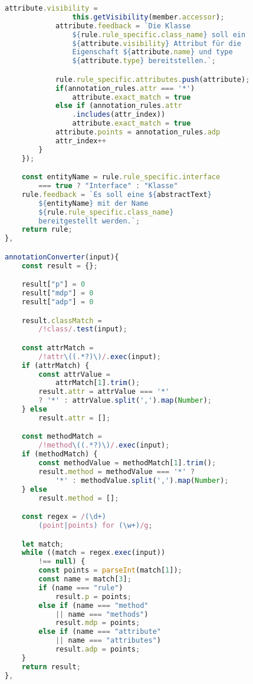 \begin{lstlisting}[caption={Class Definition Rule}, label={lst:rule_object_gen}, language=javascript]
            attribute.visibility =
                this.getVisibility(member.accessor);
            attribute.feedback = `Die Klasse
                ${rule.rule_specific.class_name} soll ein
                ${attribute.visibility} Attribut für die
                Eigenschaft ${attribute.name} und type
                ${attribute.type} bereitstellen.`;

            rule.rule_specific.attributes.push(attribute);
            if(annotation_rules.attr === '*')
                attribute.exact_match = true
            else if (annotation_rules.attr
                .includes(attr_index))
                attribute.exact_match = true
            attribute.points = annotation_rules.adp
            attr_index++
        }
    });

    const entityName = rule.rule_specific.interface
        === true ? "Interface" : "Klasse"
    rule.feedback = `Es soll eine ${abstractText}
        ${entityName} mit der Name
        ${rule.rule_specific.class_name}
        bereitgestellt werden.`;
    return rule;
},

annotationConverter(input){
    const result = {};

    result["p"] = 0
    result["mdp"] = 0
    result["adp"] = 0

    result.classMatch =
        /!class/.test(input);

    const attrMatch =
        /!attr\((.*?)\)/.exec(input);
    if (attrMatch) {
        const attrValue =
            attrMatch[1].trim();
        result.attr = attrValue === '*'
        ? '*' : attrValue.split(',').map(Number);
    } else
        result.attr = [];

    const methodMatch =
        /!method\((.*?)\)/.exec(input);
    if (methodMatch) {
        const methodValue = methodMatch[1].trim();
        result.method = methodValue === '*' ?
            '*' : methodValue.split(',').map(Number);
    } else
        result.method = [];

    const regex = /(\d+)
        (point|points) for (\w+)/g;

    let match;
    while ((match = regex.exec(input))
        !== null) {
        const points = parseInt(match[1]);
        const name = match[3];
        if (name === "rule")
            result.p = points;
        else if (name === "method"
            || name === "methods")
            result.mdp = points;
        else if (name === "attribute"
            || name === "attributes")
            result.adp = points;
    }
    return result;
},
\end{lstlisting}

